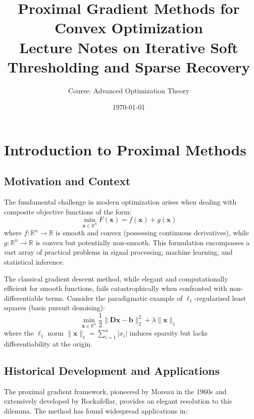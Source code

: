 \documentclass[12pt]{article}
\title{Proximal Gradient Methods for Convex Optimization\\
\large Lecture Notes on Iterative Soft Thresholding and Sparse Recovery}
\author{Course: Advanced Optimization Theory}
\date{\today}
\renewcommand{\vec}[1]{\mathbf{#1}}
\newcommand{\norm}[1]{\lVert #1 \rVert}
\newcommand{\abs}[1]{\lvert #1 \rvert}
\newcommand{\R}{\mathbb{R}}
\theoremstyle{definition}
\begin{document}
\maketitle

\tableofcontents
\newpage

\section{Introduction to Proximal Methods}

\subsection{Motivation and Context}

The fundamental challenge in modern optimization arises when dealing with composite objective functions of the form:
\begin{equation}\label{eq:composite}
    \min_{\vec{x} \in \R^n} F(\vec{x}) = f(\vec{x}) + g(\vec{x})
\end{equation}
where $f: \R^n \to \R$ is smooth and convex (possessing continuous derivatives), while $g: \R^n \to \R$ is convex but potentially non-smooth. This formulation encompasses a vast array of practical problems in signal processing, machine learning, and statistical inference.

The classical gradient descent method, while elegant and computationally efficient for smooth functions, fails catastrophically when confronted with non-differentiable terms. Consider the paradigmatic example of $\ell_1$-regularized least squares (basis pursuit denoising):
\begin{equation}\label{eq:lasso}
    \min_{\vec{x} \in \R^n} \frac{1}{2}\norm{\vec{D}\vec{x} - \vec{b}}_2^2 + \lambda\norm{\vec{x}}_1
\end{equation}
where the $\ell_1$ norm $\norm{\vec{x}}_1 = \sum_{i=1}^n \abs{x_i}$ induces sparsity but lacks differentiability at the origin.

\subsection{Historical Development and Applications}

The proximal gradient framework, pioneered by Moreau in the 1960s and extensively developed by Rockafellar, provides an elegant resolution to this dilemma. The method has found widespread applications in:
\end{document}

